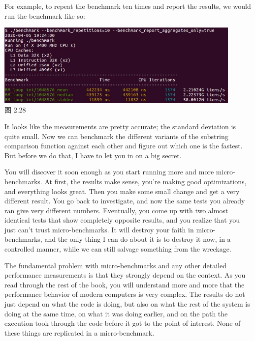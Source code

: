 For example, to repeat the benchmark ten times and report the results, we would run the benchmark like so:

\begin{center}
\includegraphics[width=0.9\textwidth]{content/1/chapter2/images/28.jpg}\\
图 2.28
\end{center}

It looks like the measurements are pretty accurate; the standard deviation is quite small. Now we can benchmark the different variants of the substring comparison function against each other and figure out which one is the fastest. But before we do that, I have to let you in on a big secret.


You will discover it soon enough as you start running more and more micro-benchmarks. At first, the results make sense, you're making good optimizations, and everything looks great. Then you make some small change and get a very different result. You go back to investigate, and now the same tests you already ran give very different numbers. Eventually, you come up with two almost identical tests that show completely opposite results, and you realize that you just can't trust micro-benchmarks. It will destroy your faith in micro-benchmarks, and the only thing I can do about it is to destroy it now, in a controlled manner, while we can still salvage something from the wreckage.

The fundamental problem with micro-benchmarks and any other detailed performance measurements is that they strongly depend on the context. As you read through the rest of the book, you will understand more and more that the performance behavior of modern computers is very complex. The results do not just depend on what the code is doing, but also on what the rest of the system is doing at the same time, on what it was doing earlier, and on the path the execution took through the code before it got to the point of interest. None of these things are replicated in a micro-benchmark.

